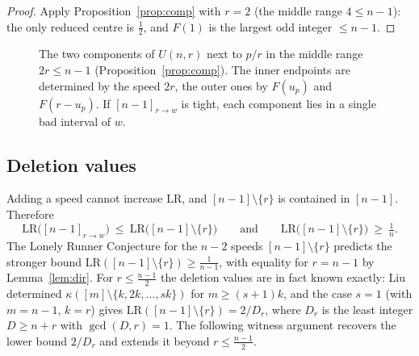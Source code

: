 \documentclass[11pt]{article}
\theoremstyle{definition}
\newcommand{\LR}{\mathrm{LR}}
\begin{document}
\begin{proof}
Apply Proposition~\ref{prop:comp} with $r=2$ (the middle range
$4\le n-1$): the only reduced centre is $\frac12$, and $F(1)$ is the
largest odd integer $\le n-1$.
\end{proof}

\begin{figure}[t]
\centering
{}
\caption{The two components of $U(n,r)$ next to $p/r$ in the middle
range $2r\le n-1$ (Proposition~\ref{prop:comp}). The inner endpoints are
determined by the speed $2r$, the outer ones by $F(u_p)$ and
$F(r-u_p)$. If $[n-1]_{r\to w}$ is tight, each component lies in a
single bad interval of $w$.}
\label{fig:components}
\end{figure}

\subsection{Deletion values}

Adding a speed cannot increase $\LR$, and $[n-1]\setminus\{r\}$ is
contained in $[n-1]$. Therefore
\begin{equation}\label{eq:sandwich}
\LR\bigl([n-1]_{r\to w}\bigr)\ \le\ \LR\bigl([n-1]\setminus\{r\}\bigr)
\qquad\text{and}\qquad
\LR\bigl([n-1]\setminus\{r\}\bigr)\ \ge\ \tfrac1n .
\end{equation}
The Lonely Runner Conjecture for the $n-2$ speeds
$[n-1]\setminus\{r\}$ predicts the stronger bound
$\LR([n-1]\setminus\{r\})\ge\frac1{n-1}$, with equality for $r=n-1$ by
Lemma~\ref{lem:dir}. For $r\le\frac{n-1}2$ the deletion values are in
fact known exactly: Liu \cite[Thm.~18]{Liu2008} determined
$\kappa([m]\setminus\{k,2k,\dots,sk\})$ for $m\ge(s+1)k$, and the case
$s=1$ (with $m=n-1$, $k=r$) gives
$\LR([n-1]\setminus\{r\})=2/D_r$, where $D_r$ is the least integer
$D\ge n+r$ with $\gcd(D,r)=1$. The following witness argument recovers
the lower bound $2/D_r$ and extends it beyond $r\le\frac{n-1}2$.
\end{document}
